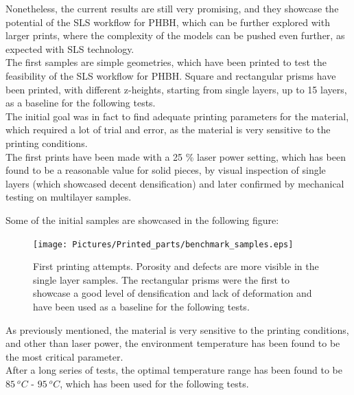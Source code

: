 \documentclass{article}
\begin{document}
        Nonetheless, the current results are still very promising, and they showcase the potential of the SLS workflow
        for PHBH, which can be further explored with larger prints, where the complexity of the models 
        can be pushed even further, as expected with SLS technology. \\  

        The first samples are simple geometries, which have been printed to test the feasibility of the SLS workflow 
        for PHBH. Square and rectangular prisms have been printed, with different z-heights, starting from single 
        layers, up to 15 layers, as a baseline for the following tests. \\ 

        The initial goal was in fact to find adequate printing parameters for the material, which required a lot 
        of trial and error, as the material is very sensitive to the printing conditions. \\

        The first prints have been made with a 25 \%  laser power setting, which has been found to be 
        a reasonable value for solid pieces, by visual inspection of single layers (which showcased 
        decent densification) and later confirmed by 
        mechanical testing on multilayer samples. 
        
        \clearpage

        Some of the initial samples are showcased in the following figure: 

        \begin{figure}[h!]
            \centering
            \texttt{[image: Pictures/Printed\_parts/benchmark\_samples.eps]}
            \caption{First printing attempts. Porosity and defects are more visible in the single layer samples.
            The rectangular prisms were the first to showcase a good level of densification and lack of deformation and 
            have been used as a baseline for the following tests.}
            \label{fig:printed_benchmarks}
        \end{figure}

        As previously mentioned, the material is very sensitive to the printing conditions, and other than laser power,
        the environment temperature has been found to be the most critical parameter. \\ 

        After a long series of tests, the optimal temperature range has been found to be $85 \ ^oC$ - $95 \ ^oC$, which has been
        used for the following tests. \\ 
\end{document}
